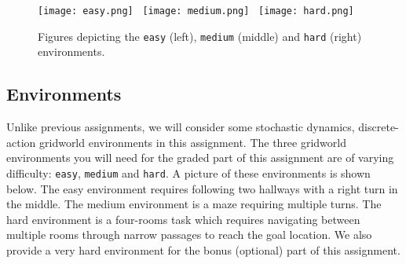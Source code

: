 \documentclass{article}
\begin{document}
\begin{figure}[h]
    \centering
    \texttt{[image: easy.png]}~
    \texttt{[image: medium.png]}~
    \texttt{[image: hard.png]}
    \vspace{-10pt}
    \caption{Figures depicting the \texttt{easy} (left), \texttt{medium} (middle) and \texttt{hard} (right) environments.}
    \vspace{-10pt}
\end{figure}
\subsection{Environments}
Unlike previous assignments, we will consider some stochastic dynamics, discrete-action gridworld environments in this assignment. The three gridworld environments you will need for the graded part of this assignment are of varying difficulty: \texttt{easy}, \texttt{medium} and \texttt{hard}. A picture of these environments is shown below. The easy environment requires following two hallways with a right turn in the middle. The medium environment is a maze requiring multiple turns. The hard environment is a four-rooms task which requires navigating between multiple rooms through narrow passages to reach the goal location. We also provide a very hard environment for the bonus (optional) part of this assignment.
\end{document}

